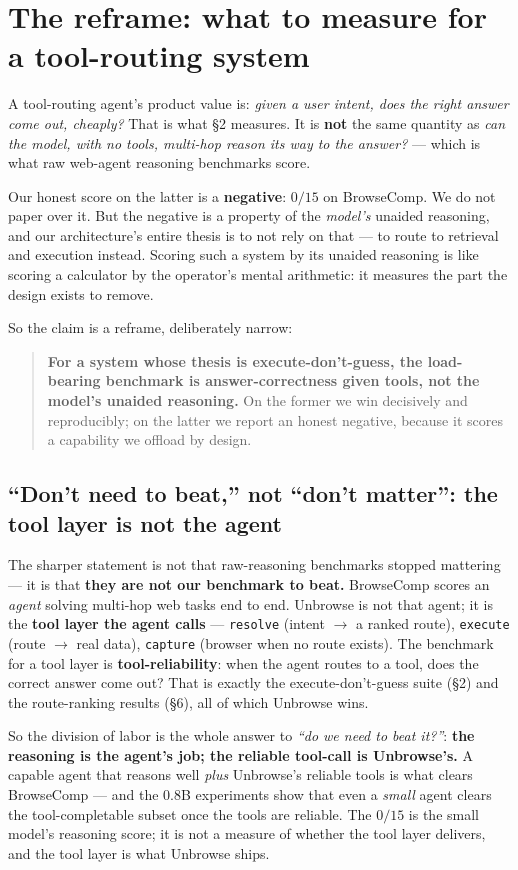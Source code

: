 \documentclass[11pt]{article}
\begin{document}
\section{The reframe: what to measure for a tool-routing system}
A tool-routing agent's product value is: \emph{given a user intent, does the right
answer come out, cheaply?} That is what \S2 measures. It is \textbf{not} the same
quantity as \emph{can the model, with no tools, multi-hop reason its way to the
answer?} --- which is what raw web-agent reasoning benchmarks score.

Our honest score on the latter is a \textbf{negative}: $0/15$ on BrowseComp. We do
not paper over it. But the negative is a property of the \emph{model's} unaided
reasoning, and our architecture's entire thesis is to not rely on that --- to route
to retrieval and execution instead. Scoring such a system by its unaided reasoning is
like scoring a calculator by the operator's mental arithmetic: it measures the part
the design exists to remove.

So the claim is a reframe, deliberately narrow:

\begin{quote}
\textbf{For a system whose thesis is execute-don't-guess, the load-bearing benchmark
is answer-correctness given tools, not the model's unaided reasoning.} On the former
we win decisively and reproducibly; on the latter we report an honest negative,
because it scores a capability we offload by design.
\end{quote}

\subsection{``Don't need to beat,'' not ``don't matter'': the tool layer is not the agent}
The sharper statement is not that raw-reasoning benchmarks stopped mattering --- it
is that \textbf{they are not our benchmark to beat.} BrowseComp scores an \emph{agent}
solving multi-hop web tasks end to end. Unbrowse is not that agent; it is the
\textbf{tool layer the agent calls} --- \texttt{resolve} (intent $\to$ a ranked
route), \texttt{execute} (route $\to$ real data), \texttt{capture} (browser when no
route exists). The benchmark for a tool layer is \textbf{tool-reliability}: when the
agent routes to a tool, does the correct answer come out? That is exactly the
execute-don't-guess suite (\S2) and the route-ranking results (\S6), all of which
Unbrowse wins.

So the division of labor is the whole answer to \emph{``do we need to beat it?''}:
\textbf{the reasoning is the agent's job; the reliable tool-call is Unbrowse's.} A
capable agent that reasons well \emph{plus} Unbrowse's reliable tools is what clears
BrowseComp --- and the 0.8B experiments show that even a \emph{small} agent clears
the tool-completable subset once the tools are reliable. The $0/15$ is the small
model's reasoning score; it is not a measure of whether the tool layer delivers, and
the tool layer is what Unbrowse ships.
\end{document}
